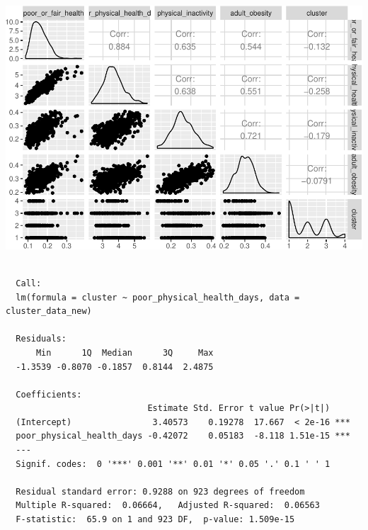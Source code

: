 \documentclass[12pt,twoside]{amherstthesis}
\begin{document}
  \begin{Shaded}
  \end{Shaded}
  
  \begin{center}\includegraphics{Comps_Proj_files/figure-latex/unnamed-chunk-10-1} \end{center}
  
  \begin{Shaded}
  \begin{Highlighting}[]
  \StringTok{ }\OperatorTok{~}\StringTok{ }
  \end{Highlighting}
  \end{Shaded}
  
  \begin{verbatim}
  
  Call:
  lm(formula = cluster ~ poor_physical_health_days, data = cluster_data_new)
  
  Residuals:
      Min      1Q  Median      3Q     Max 
  -1.3539 -0.8070 -0.1857  0.8144  2.4875 
  
  Coefficients:
                            Estimate Std. Error t value Pr(>|t|)    
  (Intercept)                3.40573    0.19278  17.667  < 2e-16 ***
  poor_physical_health_days -0.42072    0.05183  -8.118 1.51e-15 ***
  ---
  Signif. codes:  0 '***' 0.001 '**' 0.01 '*' 0.05 '.' 0.1 ' ' 1
  
  Residual standard error: 0.9288 on 923 degrees of freedom
  Multiple R-squared:  0.06664,   Adjusted R-squared:  0.06563 
  F-statistic:  65.9 on 1 and 923 DF,  p-value: 1.509e-15
  \end{verbatim}
  
\end{document}
